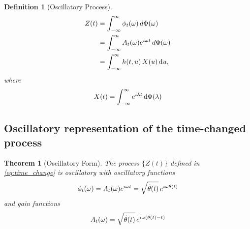 \documentclass{article}
\newtheorem{definition}{Definition}
\newtheorem{theorem}{Theorem}
\begin{document}
\begin{definition}[Oscillatory Process]
\begin{equation}
    \begin{aligned}
      Z (t) & = \int_{- \infty}^{\infty} \phi_t (\omega)  \hspace{0.17em} d
      \Phi (\omega)\\
      & = \int_{- \infty}^{\infty} A_t (\omega) e^{i \omega t} 
      \hspace{0.17em} d \Phi (\omega)\\
      & = \int_{- \infty}^{\infty} h (t, u)  \hspace{0.17em} X (u)
      \hspace{0.17em} \mathrm{d} u,
    \end{aligned}
  \end{equation}
  where
  \begin{equation}
    X (t) = \int_{- \infty}^{\infty} e^{i \lambda t} \hspace{0.17em}
    \mathrm{d} \Phi (\lambda)
  \end{equation}
\end{definition}

\subsection{Oscillatory representation of the time-changed process}

\begin{theorem}[Oscillatory Form]
  \label{thm:osc_rep}The process $\{Z (t)\}$ defined in \eqref{eq:time_change}
  is oscillatory with oscillatory functions
  \begin{equation}
    \label{eq:phi_def} \phi_t (\omega) = A_t (\omega) e^{i \omega t} =
    \sqrt{\dot{\theta} (t)}  \hspace{0.17em} e^{i \omega \theta (t)}
  \end{equation}
  and gain functions
  \begin{equation}
    A_t (\omega) = \sqrt{\dot{\theta} (t)}  \hspace{0.17em} e^{i \omega
    (\theta (t) - t)}
  \end{equation}
\end{theorem}
\end{document}
